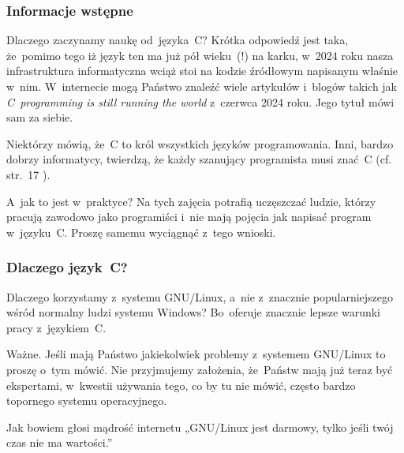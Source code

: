 \documentclass[10pt,t]{beamer}
\begin{document}
\begin{frame}
  \frametitle{Informacje wstępne}


  Dlaczego zaczynamy naukę od~języka~C? Krótka odpowiedź jest taka,
  że~pomimo tego iż język ten ma już pół wieku~(!) na karku, w~2024 roku
  nasza infrastruktura informatyczna wciąż stoi na kodzie źródłowym
  napisanym właśnie w~nim. W~internecie mogą Państwo znaleźć wiele
  artykułów i~blogów takich jak
  {\textit{C~programming is still running the world}}
  \parencite{Scott-C-programming-is-still-ETC-Ver-2024} z~czerwca 2024 roku.
  Jego tytuł mówi sam za siebie.

  Niektórzy mówią, że~C to król wszystkich języków programowania.
  Inni, bardzo dobrzy informatycy, twierdzą, że każdy szanujący
  programista musi znać~C (cf. str.~17
  \parencite{Hoey-Programowanie-w-asemblerze-x64-ETC-Pub-2024}).

  A~jak to jest w~praktyce? Na tych zajęcia potrafią uczęszczać ludzie,
  którzy pracują zawodowo jako programiści i~nie mają pojęcia jak napisać
  program w~języku~C. Proszę samemu wyciągnąć z~tego wnioski.

\end{frame}





\begin{frame}
  \frametitle{Dlaczego język~C?}


  Dlaczego korzystamy z~systemu GNU/Linux, a~nie z~znacznie
  popularniejszego wśród normalny ludzi systemu Windows? Bo~oferuje
  znacznie lepsze warunki pracy z~językiem~C.

  \alert{Ważne.} Jeśli mają Państwo jakiekolwiek problemy z~systemem
  GNU/Linux to proszę o~tym \alert{mówić}. Nie przyjmujemy założenia,
  że~Państw mają już teraz być ekspertami, w~kwestii używania tego, co by
  tu nie mówić, często bardzo topornego systemu operacyjnego.

  Jak bowiem głosi mądrość internetu „GNU/Linux jest darmowy, tylko jeśli
  twój czas nie ma wartości.”

\end{frame}
\end{document}
